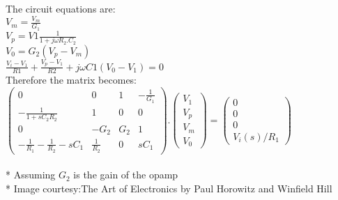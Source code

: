 \documentclass[11pt]{article}
\begin{document}
The circuit equations are: \\
    \(V_m=\frac{V_m}{G_1}\)\\
\(V_p=V1\frac{1}{1+j\omega R_2.C_2}\) \\
\(V_0=G_2(V_p-V_m)\)\\
\(\frac{V_i-V_1}{R1}+\frac{V_p-V_1}{R2}+j\omega C1(V_0-V_1)=0\)\\
Therefore the matrix becomes:\\
\(\begin{pmatrix}  0 & 0 & 1 & -\frac{1}{G_1} \\  -\frac{1}{1+sC_2R_2} & 1 & 0 & 0 \\  0 & -G_2 & G_2 & 1\\  -\frac{1}{R_1}-\frac{1}{R_2}-sC_1 & \frac{1}{R_2} & 0 & sC_1  \end{pmatrix}  .  \begin{pmatrix}  V_1\\  V_p\\  V_m\\  V_0  \end{pmatrix} = \begin{pmatrix}  0\\  0\\  0\\  V_i(s)/R_1  \end{pmatrix}\)\\
\\ * Assuming \(G_2\) is the gain of the opamp
\\ * Image courtesy:The Art of
Electronics by Paul Horowitz and Winfield Hill
\end{document}
